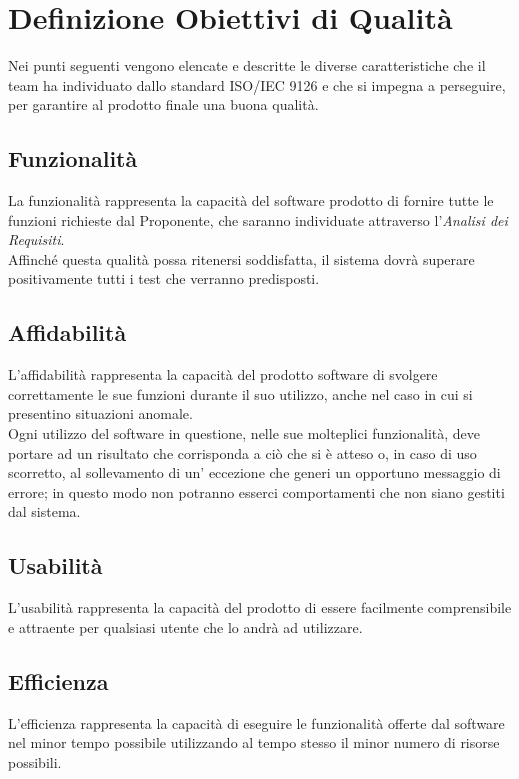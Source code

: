 \section{Definizione Obiettivi di Qualità}
Nei punti seguenti vengono elencate e descritte le diverse caratteristiche che il team ha individuato dallo standard ISO/IEC 9126 e che si impegna a perseguire, per garantire al prodotto finale una buona qualità.	

\subsection{Funzionalità}
La funzionalità rappresenta la capacità del software prodotto di fornire tutte le funzioni richieste dal Proponente, che saranno individuate attraverso l'\textit{Analisi dei Requisiti}. \\ Affinché questa qualità possa ritenersi soddisfatta, il sistema dovrà superare positivamente tutti i test che verranno predisposti.

\subsection{Affidabilità}
L’affidabilità rappresenta la capacità del prodotto software di svolgere correttamente le sue funzioni durante il suo utilizzo, anche nel caso in cui si presentino situazioni anomale. \\ Ogni utilizzo del software in questione, nelle sue molteplici funzionalità, deve portare ad un risultato che corrisponda a ciò che si è atteso o, in caso di uso scorretto, al sollevamento di un' eccezione che generi un opportuno messaggio di errore; in questo modo non potranno esserci comportamenti che non siano gestiti dal sistema.

\subsection{Usabilità}
L’usabilità rappresenta la capacità del prodotto di essere facilmente comprensibile e attraente per qualsiasi utente che lo andrà ad utilizzare.

\subsection{Efficienza}
L’efficienza rappresenta la capacità di eseguire le funzionalità offerte dal software nel minor tempo possibile utilizzando al tempo stesso il minor numero di risorse possibili.

